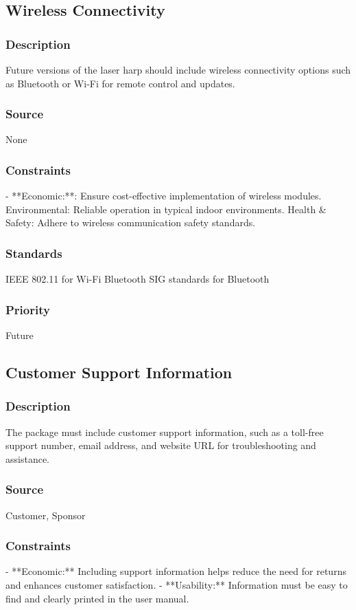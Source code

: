 \subsection{Wireless Connectivity}
\subsubsection{Description}
Future versions of the laser harp should include wireless connectivity options such as Bluetooth or Wi-Fi for remote control and updates.
\subsubsection{Source}
None
\subsubsection{Constraints}
- **Economic:**: Ensure cost-effective implementation of wireless modules.
Environmental: Reliable operation in typical indoor environments.
Health & Safety: Adhere to wireless communication safety standards.
\subsubsection{Standards}
IEEE 802.11 for Wi-Fi
Bluetooth SIG standards for Bluetooth
\subsubsection{Priority}
Future


\subsection{Customer Support Information}
\subsubsection{Description}
The package must include customer support information, such as a toll-free support number, email address, and website URL for troubleshooting and assistance.
\subsubsection{Source}
Customer, Sponsor
\subsubsection{Constraints}
- **Economic:** Including support information helps reduce the need for returns and enhances customer satisfaction.
- **Usability:** Information must be easy to find and clearly printed in the user manual.
